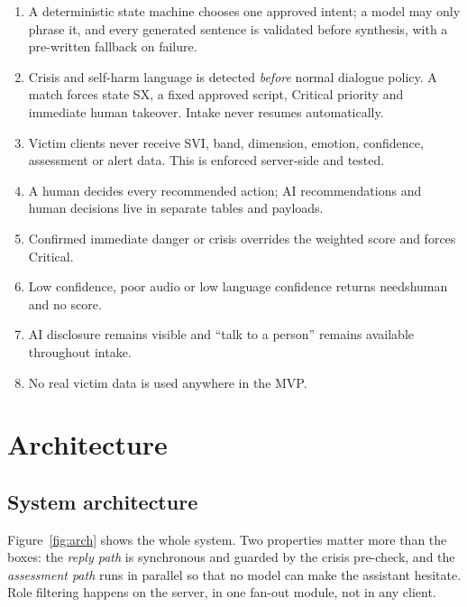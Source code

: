 \documentclass[11pt,a4paper]{article}
\newcommand{\codeus}{\textunderscore\allowbreak}
\DeclareRobustCommand{\code}[1]{{\ttfamily\let\_\codeus #1}}
\begin{document}
\begin{enumerate}[itemsep=1pt]
  \item A deterministic state machine chooses one approved intent; a model may only phrase it, and
        every generated sentence is validated before synthesis, with a pre-written fallback on
        failure.
  \item Crisis and self-harm language is detected \emph{before} normal dialogue policy. A match
        forces state SX, a fixed approved script, Critical priority and immediate human takeover.
        Intake never resumes automatically.
  \item Victim clients never receive SVI, band, dimension, emotion, confidence, assessment or alert
        data. This is enforced server-side and tested.
  \item A human decides every recommended action; AI recommendations and human decisions live in
        separate tables and payloads.
  \item Confirmed immediate danger or crisis overrides the weighted score and forces Critical.
  \item Low confidence, poor audio or low language confidence returns \code{needs\_human} and no
        score.
  \item AI disclosure remains visible and ``talk to a person'' remains available throughout intake.
  \item No real victim data is used anywhere in the MVP.
\end{enumerate}

\section{Architecture}
\label{sec:arch}

\subsection{System architecture}
Figure~\ref{fig:arch} shows the whole system. Two properties matter more than the boxes: the
\emph{reply path} is synchronous and guarded by the crisis pre-check, and the \emph{assessment path}
runs in parallel so that no model can make the assistant hesitate. Role filtering happens on the
server, in one fan-out module, not in any client.
\end{document}
